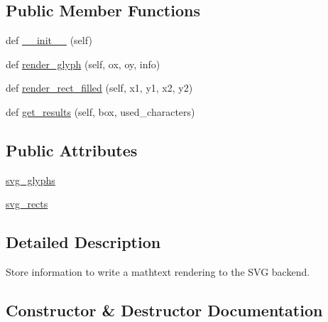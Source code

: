 \subsection*{Public Member Functions}
\begin{DoxyCompactItemize}
\item 
def \hyperlink{classmatplotlib_1_1mathtext_1_1MathtextBackendSvg_acd1a0dc61a19f3b218b65df3cc2f0728}{\+\_\+\+\_\+init\+\_\+\+\_\+} (self)
\item 
def \hyperlink{classmatplotlib_1_1mathtext_1_1MathtextBackendSvg_ade484352d3b39f1d9c9766df444a4e8a}{render\+\_\+glyph} (self, ox, oy, info)
\item 
def \hyperlink{classmatplotlib_1_1mathtext_1_1MathtextBackendSvg_a3058df32f42aec9ce7f9a6fe03fb1b1f}{render\+\_\+rect\+\_\+filled} (self, x1, y1, x2, y2)
\item 
def \hyperlink{classmatplotlib_1_1mathtext_1_1MathtextBackendSvg_afd10b7d9e4c5527d3b376cf456d71dcb}{get\+\_\+results} (self, box, used\+\_\+characters)
\end{DoxyCompactItemize}
\subsection*{Public Attributes}
\begin{DoxyCompactItemize}
\item 
\hyperlink{classmatplotlib_1_1mathtext_1_1MathtextBackendSvg_a4a3eb410521361737c877e2c4c45fe9f}{svg\+\_\+glyphs}
\item 
\hyperlink{classmatplotlib_1_1mathtext_1_1MathtextBackendSvg_a388f271aa4963a2e2b06d6d2688a40d0}{svg\+\_\+rects}
\end{DoxyCompactItemize}


\subsection{Detailed Description}
\begin{DoxyVerb}Store information to write a mathtext rendering to the SVG
backend.
\end{DoxyVerb}
 

\subsection{Constructor \& Destructor Documentation}
\mbox{\label{classmatplotlib_1_1mathtext_1_1MathtextBackendSvg_acd1a0dc61a19f3b218b65df3cc2f0728}} 
